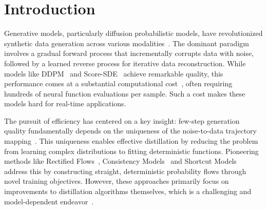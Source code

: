 \documentclass{article}
\theoremstyle{plain}
\theoremstyle{definition}
\theoremstyle{remark}
\begin{document}
\begin{abstract}
 






\end{abstract}

\vspace{-4mm}
\section{Introduction}
\label{sec:intro}
Generative models, particularly diffusion probabilistic models, have revolutionized synthetic data generation across various modalities~\cite{diffusion,song2019score,ddpm,rombach2022high,ho2020denoising}. The dominant paradigm involves a gradual forward process that incrementally corrupts data with noise, followed by a learned reverse process for iterative data reconstruction. While models like DDPM~\cite{ddpm} and Score-SDE~\cite{song2020denoising} achieve remarkable quality, this performance comes at a substantial computational cost~\cite{lu2022dpm,dpm_plus_plus,karras2022elucidating}, often requiring hundreds of neural function evaluations per sample. Such a cost makes these models hard for real-time applications.

The pursuit of efficiency has centered on a key insight: few-step generation quality fundamentally depends on the uniqueness of the noise-to-data trajectory mapping~\cite{lipman2022flow,frans2024one,boffi2024flow,salimans2022progressive}. This uniqueness enables effective distillation by reducing the problem from learning complex distributions to fitting deterministic functions. Pioneering methods like Rectified Flows~\cite{lipman2022flow}, Consistency Models~\cite{song2023consistency} and Shortcut Models~\cite{frans2024one} address this by constructing straight, deterministic probability flows through novel training objectives. However, these approaches primarily focus on improvements to distillation algorithms themselves, which is a challenging and model-dependent endeavor~\cite{salimans2022progressive,geng2024one,sauer2023adversarial}.
\end{document}
